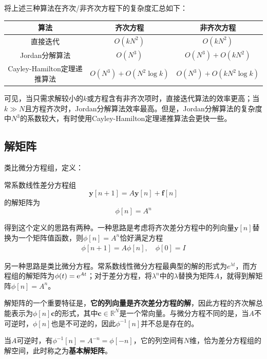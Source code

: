 将上述三种算法在齐次/非齐次方程下的复杂度汇总如下：
\begin{table}[H]
    \centering
    \begin{tabular}{|c|c|c|}
        \hline
        算法 & 齐次方程 & 非齐次方程 \\
        \hline
        直接迭代 & $O(k N^2)$ & $O(k N^2)$ \\
        \hline
        Jordan分解算法 & $O(N^3)$ & $O(N^3)+O(k N^2)$ \\
        \hline
        Cayley-Hamilton定理递推算法 & $O(N^3)+O(N^2 \log k)$ & $O(N^3)+O(k N^2 \log k)$ \\
        \hline
    \end{tabular}
\end{table}

可见，当只需求解较小的$k$或方程含有非齐次项时，直接迭代算法的效率更高；当$k\gg N$且方程齐次时，Jordan分解算法效率最高。但是，Jordan分解算法的复杂度中$N^3$的系数较大，有时使用Cayley-Hamilton定理递推算法会更快一些。

\subsection{解矩阵}\label{sub:fundamental_solution_matrix}

类比微分方程组，定义：
\begin{definition}[解矩阵]
    常系数线性差分方程组
    $$\mathbf{y}[n+1] = A \mathbf{y}[n] + \mathbf{f}[n]$$
    的解矩阵为
    $$\phi[n]=A^n$$
\end{definition}

得到这个定义的思路有两种。一种思路是考虑将齐次差分方程中的列向量$\mathbf{y}[n]$替换为一个矩阵值函数，则$\phi[n]=A^n$恰好满足方程\begin{align*}
    \phi[n+1] = A \phi[n],\quad \phi[0] = I
\end{align*}

另一种思路是类比微分方程。常系数线性微分方程最典型的解的形式为$e^{\lambda t}$，而方程组的解矩阵为$\phi(t)=\mathrm{e}^{At}$；对于差分方程，将$\lambda^n$中的$\lambda$替换为矩阵$A$，就得到解矩阵$\phi[n]=A^n$。

解矩阵的一个重要特征是，\textbf{它的列向量是齐次差分方程的解}，因此方程的齐次解总能表示为$\phi[n]\mathbf{c}$的形式，其中$\mathbf{c}\in\mathbb{R}^N$是一个常向量。与微分方程不同的是，当$A$不可逆时，$\phi[n]$也是不可逆的，因此$\phi^{-1}[n]$并不总是存在的。

当$A$可逆时，有$\phi^{-1}[n] = A^{-n}=\phi[-n]$，它的列空间有$N$维，恰为差分方程组的解空间，此时称之为\textbf{基本解矩阵}。

